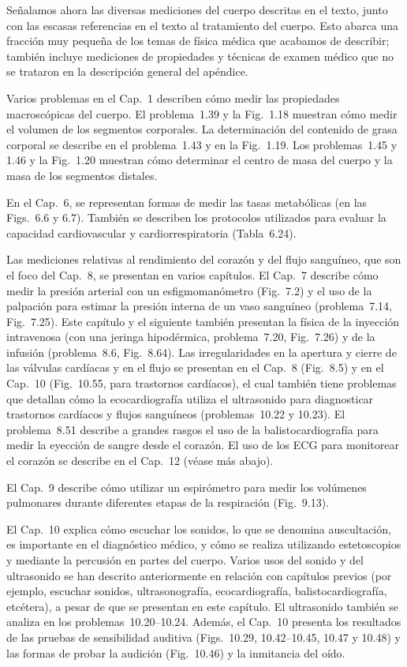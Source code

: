 \documentclass[12pt,a4paper]{book}
\begin{document}
Señalamos ahora las diversas mediciones del cuerpo descritas en el texto, junto con las escasas referencias en el texto al tratamiento del cuerpo. Esto abarca una fracción muy pequeña de los temas de física médica que acabamos de describir; también incluye mediciones de propiedades y técnicas de examen médico que no se trataron en la descripción general del apéndice.

Varios problemas en el Cap.~1 describen cómo medir las propiedades macroscópicas del cuerpo. El problema~1.39 y la Fig.~1.18 muestran cómo medir el volumen de los segmentos corporales. La determinación del contenido de grasa corporal se describe en el problema~1.43 y en la Fig.~1.19. Los problemas~1.45 y 1.46 y la Fig.~1.20 muestran cómo determinar el centro de masa del cuerpo y la masa de los segmentos distales.

En el Cap.~6, se representan formas de medir las tasas metabólicas (en las Figs.~6.6 y 6.7). También se describen los protocolos utilizados para evaluar la capacidad cardiovascular y cardiorrespiratoria (Tabla~6.24).

Las mediciones relativas al rendimiento del corazón y del flujo sanguíneo, que son el foco del Cap.~8, se presentan en varios capítulos. El Cap.~7 describe cómo medir la presión arterial con un esfigmomanómetro (Fig.~7.2) y el uso de la palpación para estimar la presión interna de un vaso sanguíneo (problema~7.14, Fig.~7.25). Este capítulo y el siguiente también presentan la física de la inyección intravenosa (con una jeringa hipodérmica, problema~7.20, Fig.~7.26) y de la infusión (problema~8.6, Fig.~8.64). Las irregularidades en la apertura y cierre de las válvulas cardíacas y en el flujo se presentan en el Cap.~8 (Fig.~8.5) y en el Cap.~10 (Fig.~10.55, para trastornos cardíacos), el cual también tiene problemas que detallan cómo la ecocardiografía utiliza el ultrasonido para diagnosticar trastornos cardíacos y flujos sanguíneos (problemas~10.22 y 10.23). El problema~8.51 describe a grandes rasgos el uso de la balistocardiografía para medir la eyección de sangre desde el corazón. El uso de los ECG para monitorear el corazón se describe en el Cap.~12 (véase más abajo).

El Cap.~9 describe cómo utilizar un espirómetro para medir los volúmenes pulmonares durante diferentes etapas de la respiración (Fig.~9.13).

El Cap.~10 explica cómo escuchar los sonidos, lo que se denomina auscultación, es importante en el diagnóstico médico, y cómo se realiza utilizando estetoscopios y mediante la percusión en partes del cuerpo. Varios usos del sonido y del ultrasonido se han descrito anteriormente en relación con capítulos previos (por ejemplo, escuchar sonidos, ultrasonografía, ecocardiografía, balistocardiografía, etcétera), a pesar de que se presentan en este capítulo. El ultrasonido también se analiza en los problemas~10.20--10.24. Además, el Cap.~10 presenta los resultados de las pruebas de sensibilidad auditiva (Figs.~10.29, 10.42--10.45, 10.47 y 10.48) y las formas de probar la audición (Fig.~10.46) y la inmitancia del oído.
\end{document}
